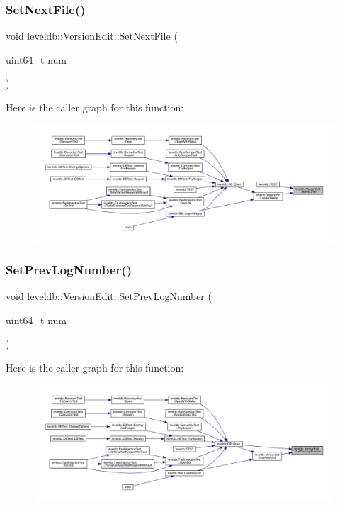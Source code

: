 \subsubsection{\texorpdfstring{SetNextFile()}{SetNextFile()}}
{\footnotesize\ttfamily void leveldb\+::\+Version\+Edit\+::\+Set\+Next\+File (\begin{DoxyParamCaption}\item[{uint64\+\_\+t}]{num }\end{DoxyParamCaption})\hspace{0.3cm}{\ttfamily [inline]}}

Here is the caller graph for this function\+:
\nopagebreak
\begin{figure}[H]
\begin{center}
\leavevmode
\includegraphics[width=350pt]{classleveldb_1_1_version_edit_a4c104515adf573be0ead29e6835f14fb_icgraph}
\end{center}
\end{figure}
\mbox{\label{classleveldb_1_1_version_edit_ac1b5689f62e7a8f63c4eefa437a4f2f3}} 
\subsubsection{\texorpdfstring{SetPrevLogNumber()}{SetPrevLogNumber()}}
{\footnotesize\ttfamily void leveldb\+::\+Version\+Edit\+::\+Set\+Prev\+Log\+Number (\begin{DoxyParamCaption}\item[{uint64\+\_\+t}]{num }\end{DoxyParamCaption})\hspace{0.3cm}{\ttfamily [inline]}}

Here is the caller graph for this function\+:
\nopagebreak
\begin{figure}[H]
\begin{center}
\leavevmode
\includegraphics[width=350pt]{classleveldb_1_1_version_edit_ac1b5689f62e7a8f63c4eefa437a4f2f3_icgraph}
\end{center}
\end{figure}


